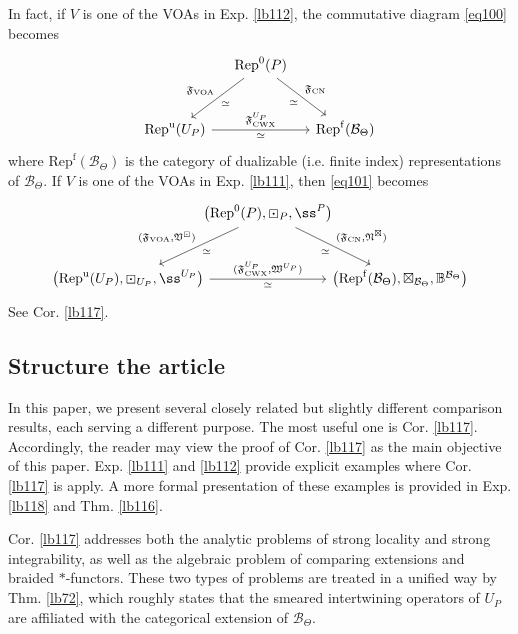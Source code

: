 \documentclass[11pt,b5paper,notitlepage]{article}
\theoremstyle{definition}
\theoremstyle{plain}
\newcommand{\fk}{\mathfrak}
\newcommand{\mc}{\mathcal}
\newcommand{\Rep}{\mathrm{Rep}}
\newcommand{\Repf}{\mathrm{Rep}^{\mathrm f}}
\newcommand{\CWX}{{\scriptscriptstyle \mathrm{CWX}}}
\newcommand{\VOA}{{\scriptscriptstyle \mathrm{VOA}}}
\newcommand{\CN}{{\scriptscriptstyle \mathrm{CN}}}
\newcommand{\RepUP}{\mathrm{Rep}^{\mathrm u}(U_P)}
\numberwithin{equation}{section}
\begin{document}
In fact, if $V$ is one of the VOAs in Exp. \ref{lb112}, the commutative diagram \eqref{eq100} becomes
\begin{equation}
\begin{tikzcd}[row sep=large, column sep=small]
             & \Rep^0(P) \arrow[ld,"\simeq","\fk F_\VOA"'] \arrow[rd,"\fk F_\CN","\simeq"'] &   \\
\RepUP \arrow[rr,"{\fk F^{U_P}_\CWX}","\simeq"'] &                         & \Repf(\mc B_\Theta)
\end{tikzcd}
\end{equation}
where $\Repf(\mc B_\Theta)$ is the category of dualizable (i.e. finite index) representations of $\mc B_\Theta$. If $V$ is one of the VOAs in Exp. \ref{lb111}, then \eqref{eq101} becomes
\begin{equation}
\begin{tikzcd}[row sep=large, column sep=-0.3cm]
             & \big(\Rep^0(P),\boxdot_P,\ss^P\big) \arrow[ld,"\simeq","{(\fk F_\VOA,\fk V^\boxdot)}"'] \arrow[rd,"{(\fk F_\CN,\fk N^\boxtimes)}","\simeq"'] &   \\
\big(\RepUP,\boxdot_{U_P},\ss^{U_P}\big) \arrow[rr,"{(\fk F^{U_P}_\CWX,\fk W^{U_P})}","\simeq"'] &                         & \big(\Repf(\mc B_\Theta),\boxtimes_{\mc B_\Theta},\mathbb B^{\mc B_\Theta}\big)
\end{tikzcd}
\end{equation}
See Cor. \ref{lb117}.


\subsection{Structure the article}


In this paper, we present several closely related but slightly different comparison results, each serving a different purpose. The most useful one is Cor. \ref{lb117}. Accordingly, the reader may view the proof of Cor. \ref{lb117} as the main objective of this paper. Exp. \ref{lb111} and \ref{lb112} provide explicit examples where Cor. \ref{lb117} is apply. A more formal presentation of these examples is provided in Exp. \ref{lb118} and Thm. \ref{lb116}.

Cor. \ref{lb117} addresses both the analytic problems of strong locality and strong integrability, as well as the algebraic problem of comparing extensions and braided $*$-functors. These two types of problems are treated in a unified way by Thm. \ref{lb72}, which roughly states that the smeared intertwining operators of $U_P$ are affiliated with the categorical extension of $\mc B_\Theta$. 
\end{document}

